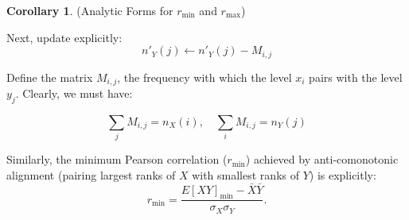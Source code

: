 \documentclass[
  12pt,
]{article}
\theoremstyle{plain}
\theoremstyle{definition}
\newtheorem{corollary}{Corollary}
\theoremstyle{remark}
\begin{document}
\begin{corollary} {(Analytic Forms for $r_{\min}$ and $r_{\max}$)}
\begin{algorithm}[H]
Next, update explicitly: $$n'_Y(j)\leftarrow n'_Y(j)-M_{i,j}$$

\end{algorithm}



Define the matrix $M_{i,j}$, the frequency with which the level $x_i$ pairs with the level $y_j$. Clearly, we must have:

$$\sum_j M_{i,j}=n_X(i),\quad\sum_i M_{i,j}=n_Y(j)$$

Similarly, the minimum Pearson correlation ($r_{\text{min}}$) achieved by anti-comonotonic alignment (pairing largest ranks of $X$ with smallest ranks of $Y$) is explicitly:
$$r_{\text{min}} = \frac{E[XY]_{\text{min}} - \bar{X}\bar{Y}}{\sigma_X \sigma_Y}.$$



\end{corollary}
\end{document}
